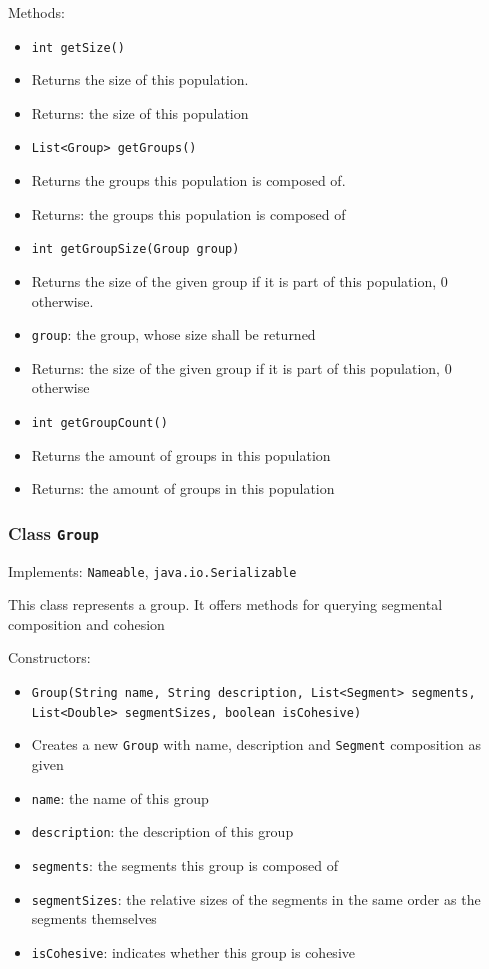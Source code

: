 \documentclass[parskip=full,11pt]{scrartcl}
\begin{document}
Methods:
\begin{itemize}\itemsep -10pt
\item \texttt{int getSize()}
\item[] Returns the size of this population.
\item[] Returns: the size of this population

\item \texttt{List<Group> getGroups()}
\item[] Returns the groups this population is composed of.
\item[] Returns: the groups this population is composed of

\item \texttt{int getGroupSize(Group group)}
\item[] Returns the size of the given group if it is part of this population, \(0\) otherwise.
\item[] \texttt{group}: the group, whose size shall be returned
\item[] Returns: the size of the given group if it is part of this population, \(0\) otherwise

\item \texttt{int getGroupCount()}
\item[] Returns the amount of groups in this population
\item[] Returns: the amount of groups in this population
\end{itemize}

\subsubsection{Class \texttt{Group}}
Implements: \texttt{Nameable}, \texttt{java.io.Serializable}

This class represents a group. It offers methods for querying segmental composition and cohesion

Constructors:
\begin{itemize}\itemsep -10pt
\item \texttt{Group(String name, String description, List<Segment> segments, List<Double> segmentSizes, boolean isCohesive)}
\item[] Creates a new \texttt{Group} with name, description and \texttt{Segment} composition as given
\item[] \texttt{name}: the name of this group
\item[] \texttt{description}: the description of this group
\item[] \texttt{segments}: the segments this group is composed of
\item[] \texttt{segmentSizes}: the relative sizes of the segments in the same order as the segments themselves
\item[] \texttt{isCohesive}: indicates whether this group is cohesive
\end{itemize}
\end{document}
